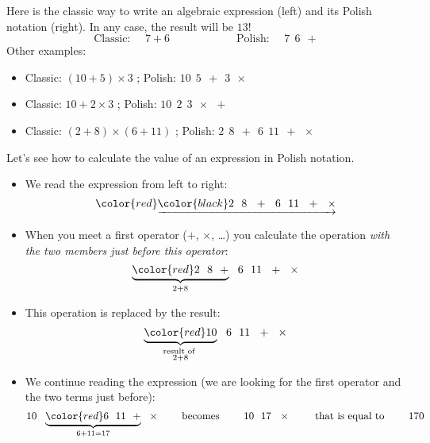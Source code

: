 \documentclass[11pt,class=report,crop=false]{standalone}
\begin{document}
\begin{cours}



Here is the classic way to write an algebraic expression (left) and its Polish notation (right). In any case, the result will be $13$!
$$\text{Classic: } \quad 7 + 6 \qquad\qquad\qquad \text{Polish: } \quad 7 \ \ 6 \ \ +$$
Other examples:
\begin{itemize}
  \item 
  Classic: $(10 + 5) \times 3$  \quad; \quad
  Polish: $10 \ \ 5 \ \ + \ \ 3 \ \ \times$
  
  \item 
  Classic: $10 + 2 \times 3$ \quad; \quad
  Polish: $10 \ \ 2 \ \ 3 \ \ \times \ \ +$  
   
  \item 
  Classic: $(2 + 8) \times (6 + 11)$ \quad ; \quad
  Polish: $2 \ \ 8 \ \ + \ \ 6 \ \ 11 \ \ + \ \ \times$ 
\end{itemize}

\bigskip

Let's see how to calculate the value of an expression in Polish notation. 
\begin{itemize}
  \item We read the expression from left to right:
$$\color{red}\underrightarrow{\color{black}2 \ \ 8 \ \ + \ \ 6 \ \ 11 \ \ + \ \ \times}$$ 

  \item When you meet a first operator ($+$, $\times$, \ldots) you calculate the operation \emph{with the two members just before this operator}: 
$$\underbrace{\color{red}2 \ \ 8 \ \ +}_{2 + 8} \ \ 6 \ \ 11 \ \ + \ \ \times$$ 
   
  \item This operation is replaced by the result:
$$\underbrace{\color{red} 10}_{\substack{\text{result of }\\2 + 8}} \ \ 6 \ \ 11 \ \ + \ \ \times$$
  
  \item We continue reading the expression (we are looking for the first operator and the two terms just before):
 $$10 \ \ \underbrace{\color{red}6 \ \ 11 \ \ +}_{6 + 11 = 17}  \ \ \times
 \qquad \text{ becomes } \qquad 
10 \ \ 17  \ \ \times  \qquad \text{ that is equal to } \qquad 170$$
  

\end{itemize}
\end{cours}
\end{document}
